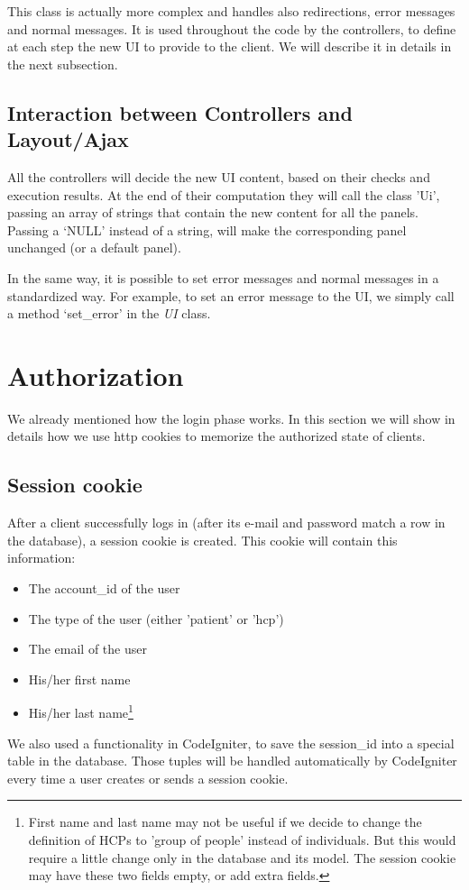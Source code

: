 This class is actually more complex and handles also redirections, error messages and normal messages. It is used throughout the code by the controllers, to define at each step the new UI to provide to the client. We will describe it in details in the next subsection.

\subsection{Interaction between Controllers and Layout/Ajax}
All the controllers will decide the new UI content, based on their checks and execution results. At the end of their computation they will call the class 'Ui', passing an array of strings that contain the new content for all the panels. Passing a `NULL' instead of a string, will make the corresponding panel unchanged (or a default panel).

In the same way, it is possible to set error messages and normal messages in a standardized way. For example, to set an error message to the UI, we simply call a method `set\_error' in the \emph{UI} class.


\section{Authorization}
We already mentioned how the login phase works. In this section we will show in details how we use http cookies to memorize the authorized state of clients.
\subsection{Session cookie}
After a client successfully logs in (after its e-mail and password match a row in the database), a session cookie is created. This cookie will contain this information:
\begin{itemize}
\item The account\_id of the user
\item The type of the user (either 'patient' or 'hcp')
\item The email of the user
\item His/her first name
\item His/her last name\footnote{First name and last name may not be useful if we decide to change the definition of HCPs to 'group of people' instead of individuals. But this would require a little change only in the database and its model. The session cookie may have these two fields empty, or add extra fields.}
\end{itemize}
We also used a functionality in CodeIgniter, to save the session\_id into a special table in the database. Those tuples will be handled automatically by CodeIgniter every time a user creates or sends a session cookie.

